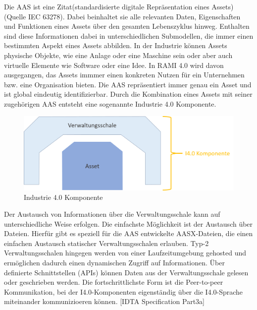 
Die AAS ist eine Zitat(standardisierte digitale Repräsentation eines Assets) (Quelle IEC 63278). Dabei beinhaltet sie alle relevanten Daten, Eigenschaften und Funktionen eines Assets über den gesamten Lebenszyklus hinweg.
Enthalten sind diese Informationen dabei in unterschiedlichen Submodellen, die immer einen bestimmten Aspekt eines Assets abbilden. 
In der Industrie können Assets physische Objekte, wie eine Anlage oder eine Maschine sein oder aber auch virtuelle Elemente wie Software oder eine Idee.
In RAMI 4.0 wird davon ausgegangen, das Assets immmer einen konkreten Nutzen für ein Unternehmen bzw. eine Organisation bieten.
Die AAS repräsentiert immer genau ein Asset und ist global eindeutig identifizierbar.
Durch die Kombination eines Assets mit seiner zugehörigen AAS entsteht eine sogenannte Industrie 4.0 Komponente.


\begin{figure}[htbp]
    \centering
    \includegraphics[width=1\textwidth]{Bilder/aas.png}
    \caption{Industrie 4.0 Komponente}
    \label{fig:klassifizierungDT}
\end{figure}

Der Austausch von Informationen über die Verwaltungsschale kann auf unterschiedliche Weise erfolgen.
Die einfachste Möglichkeit ist der Austausch über Dateien. Hierfür gibt es speziell für die AAS entwickelte AASX-Dateien, die einen einfachen Austausch statischer Verwaltungsschalen erlauben.
Typ-2 Verwaltungsschalen hingegen werden von einer Laufzeitumgebung gehosted und ermöglichen dadurch einen dynamischen Zugriff auf Informationen.
Über definierte Schnittstellen (APIs) können Daten aus der Verwaltungsschale gelesen oder geschrieben werden.
Die fortschrittlichste Form ist die Peer-to-peer Kommunikation, bei der I4.0-Komponenten eigenständig über die I4.0-Sprache miteinander kommunizioeren können.
[IDTA Specification Part3a] 

